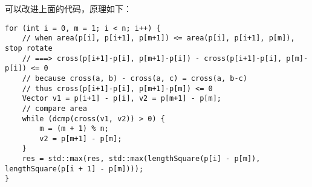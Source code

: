 可以改进上面的代码，原理如下：
\begin{verbatim}
for (int i = 0, m = 1; i < n; i++) {
    // when area(p[i], p[i+1], p[m+1]) <= area(p[i], p[i+1], p[m]), stop rotate
    // ===> cross(p[i+1]-p[i], p[m+1]-p[i]) - cross(p[i+1]-p[i], p[m]-p[i]) <= 0
    // because cross(a, b) - cross(a, c) = cross(a, b-c)
    // thus cross(p[i+1]-p[i], p[m+1]-p[m]) <= 0
    Vector v1 = p[i+1] - p[i], v2 = p[m+1] - p[m];
    // compare area
    while (dcmp(cross(v1, v2)) > 0) {
        m = (m + 1) % n;
        v2 = p[m+1] - p[m];
    }
    res = std::max(res, std::max(lengthSquare(p[i] - p[m]), lengthSquare(p[i + 1] - p[m])));
}
\end{verbatim}
